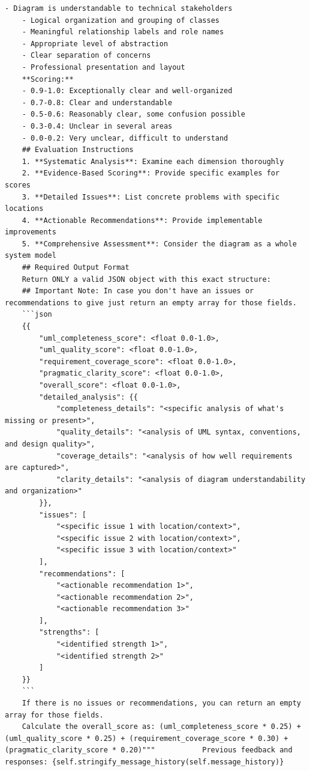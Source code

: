 \begin{lstlisting}[caption={Evaluation Prompt},label={lst:evaluation_prompt}]
    - Diagram is understandable to technical stakeholders
    - Logical organization and grouping of classes
    - Meaningful relationship labels and role names
    - Appropriate level of abstraction
    - Clear separation of concerns
    - Professional presentation and layout
    **Scoring:**
    - 0.9-1.0: Exceptionally clear and well-organized
    - 0.7-0.8: Clear and understandable
    - 0.5-0.6: Reasonably clear, some confusion possible
    - 0.3-0.4: Unclear in several areas
    - 0.0-0.2: Very unclear, difficult to understand
    ## Evaluation Instructions
    1. **Systematic Analysis**: Examine each dimension thoroughly
    2. **Evidence-Based Scoring**: Provide specific examples for scores
    3. **Detailed Issues**: List concrete problems with specific locations
    4. **Actionable Recommendations**: Provide implementable improvements
    5. **Comprehensive Assessment**: Consider the diagram as a whole system model
    ## Required Output Format
    Return ONLY a valid JSON object with this exact structure:
    ## Important Note: In case you don't have an issues or  recommendations to give just return an empty array for those fields.
    ```json
    {{
        "uml_completeness_score": <float 0.0-1.0>,
        "uml_quality_score": <float 0.0-1.0>,
        "requirement_coverage_score": <float 0.0-1.0>,
        "pragmatic_clarity_score": <float 0.0-1.0>,
        "overall_score": <float 0.0-1.0>,
        "detailed_analysis": {{
            "completeness_details": "<specific analysis of what's missing or present>",
            "quality_details": "<analysis of UML syntax, conventions, and design quality>",
            "coverage_details": "<analysis of how well requirements are captured>",
            "clarity_details": "<analysis of diagram understandability and organization>"
        }},
        "issues": [
            "<specific issue 1 with location/context>",
            "<specific issue 2 with location/context>",
            "<specific issue 3 with location/context>"
        ],
        "recommendations": [
            "<actionable recommendation 1>",
            "<actionable recommendation 2>",
            "<actionable recommendation 3>"
        ],
        "strengths": [
            "<identified strength 1>",
            "<identified strength 2>"
        ]
    }}
    ```
    If there is no issues or recommendations, you can return an empty array for those fields.
    Calculate the overall_score as: (uml_completeness_score * 0.25) + (uml_quality_score * 0.25) + (requirement_coverage_score * 0.30) + (pragmatic_clarity_score * 0.20)"""           Previous feedback and responses: {self.stringify_message_history(self.message_history)}

\end{lstlisting}